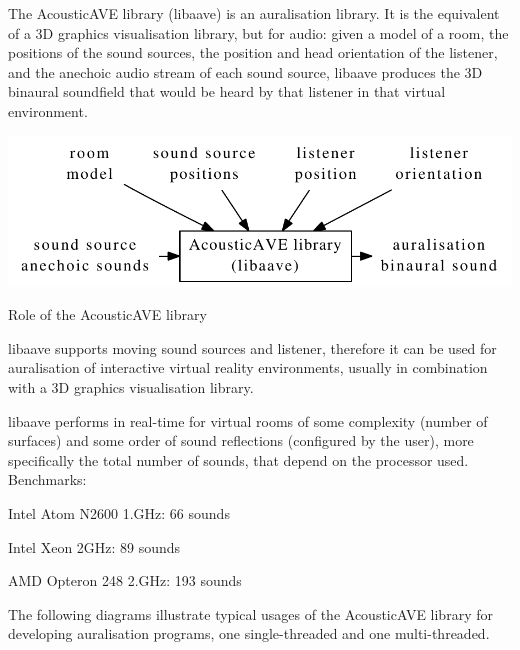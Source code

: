 The Acoustic\-A\-V\-E library (libaave) is an auralisation library. It is the equivalent of a 3\-D graphics visualisation library, but for audio\-: given a model of a room, the positions of the sound sources, the position and head orientation of the listener, and the anechoic audio stream of each sound source, libaave produces the 3\-D binaural soundfield that would be heard by that listener in that virtual environment.


\begin{DoxyImage}
\includegraphics{libaave}
\caption{Role of the Acoustic\-A\-V\-E library}
\end{DoxyImage}
 libaave supports moving sound sources and listener, therefore it can be used for auralisation of interactive virtual reality environments, usually in combination with a 3\-D graphics visualisation library.

libaave performs in real-\/time for virtual rooms of some complexity (number of surfaces) and some order of sound reflections (configured by the user), more specifically the total number of sounds, that depend on the processor used. Benchmarks\-:
\begin{DoxyItemize}
\item Intel Atom N2600 1.\-G\-Hz\-: 66 sounds
\item Intel Xeon 2\-G\-Hz\-: 89 sounds
\item A\-M\-D Opteron 248 2.\-G\-Hz\-: 193 sounds
\end{DoxyItemize}

The following diagrams illustrate typical usages of the Acoustic\-A\-V\-E library for developing auralisation programs, one single-\/threaded and one multi-\/threaded.


